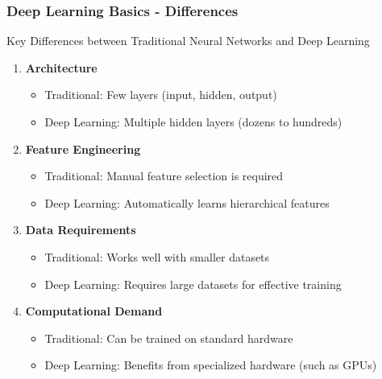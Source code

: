 \documentclass[aspectratio=169]{beamer}
\begin{document}
\begin{frame}[fragile]
    \frametitle{Deep Learning Basics - Differences}
    \begin{block}{Key Differences between Traditional Neural Networks and Deep Learning}
        \begin{enumerate}
            \item \textbf{Architecture}
                \begin{itemize}
                    \item Traditional: Few layers (input, hidden, output)
                    \item Deep Learning: Multiple hidden layers (dozens to hundreds)
                \end{itemize}
            \item \textbf{Feature Engineering}
                \begin{itemize}
                    \item Traditional: Manual feature selection is required
                    \item Deep Learning: Automatically learns hierarchical features
                \end{itemize}
            \item \textbf{Data Requirements}
                \begin{itemize}
                    \item Traditional: Works well with smaller datasets
                    \item Deep Learning: Requires large datasets for effective training
                \end{itemize}
            \item \textbf{Computational Demand}
                \begin{itemize}
                    \item Traditional: Can be trained on standard hardware
                    \item Deep Learning: Benefits from specialized hardware (such as GPUs)
                \end{itemize}
        \end{enumerate}
    \end{block}
\end{frame}
\end{document}
